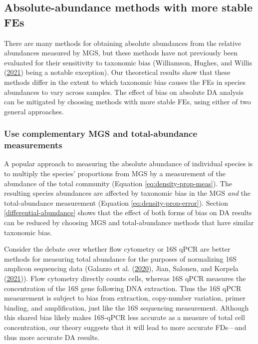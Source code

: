 \documentclass[
]{article}
\begin{document}
\hypertarget{absolute-abundance-methods-with-more-stable-fes}{%
\subsection{Absolute-abundance methods with more stable FEs}\label{absolute-abundance-methods-with-more-stable-fes}}

There are many methods for obtaining absolute abundances from the relative abundances measured by MGS, but these methods have not previously been evaluated for their sensitivity to taxonomic bias (Williamson, Hughes, and Willis (\protect\hyperlink{ref-williamson2021amul}{2021}) being a notable exception).
Our theoretical results show that these methods differ in the extent to which taxonomic bias causes the FEs in species abundances to vary across samples.
The effect of bias on absolute DA analysis can be mitigated by choosing methods with more stable FEs, using either of two general approaches.

\hypertarget{use-complementary-mgs-and-total-abundance-measurements}{%
\subsubsection{Use complementary MGS and total-abundance measurements}\label{use-complementary-mgs-and-total-abundance-measurements}}

A popular approach to measuring the absolute abundance of individual species is to multiply the species' proportions from MGS by a measurement of the abundance of the total community (Equation \eqref{eq:density-prop-meas}).
The resulting species abundances are affected by taxonomic bias in the MGS \emph{and} the total-abundance measurement (Equation \eqref{eq:density-prop-error}).
Section \ref{differential-abundance} shows that the effect of both forms of bias on DA results can be reduced by choosing MGS and total-abundance methods that have similar taxonomic bias.

Consider the debate over whether flow cytometry or 16S qPCR are better methods for measuring total abundance for the purposes of normalizing 16S amplicon sequencing data (Galazzo et al. (\protect\hyperlink{ref-galazzo2020howt}{2020}), Jian, Salonen, and Korpela (\protect\hyperlink{ref-jian2021comm}{2021})).
Flow cytometry directly counts cells, whereas 16S qPCR measures the concentration of the 16S gene following DNA extraction.
Thus the 16S qPCR measurement is subject to bias from extraction, copy-number variation, primer binding, and amplification, just like the 16S sequencing measurement.
Although this shared bias likely makes 16S-qPCR less accurate as a measure of total cell concentration, our theory suggests that it will lead to more accurate FDs---and thus more accurate DA results.
\end{document}
